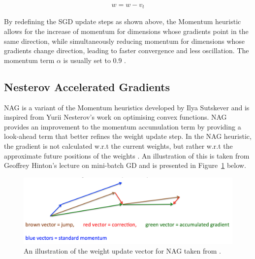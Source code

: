 \begin{equation}
      \label{eq:heuristics:gd:momentum_part_2}
      \begin{split}
            w = w - v_{t}
      \end{split}
\end{equation}

By redefining the \ac{SGD} update steps as shown above, the \ac{Momentum} heuristic allows for the increase of momentum for dimensions whose gradients point in the same direction, while simultaneously reducing momentum for dimensions whose gradients change direction, leading to faster convergence and less oscillation. The momentum term $\alpha$ is usually set to 0.9 \cite{ref:engelbrecht:2007}\cite{ref:ruder:2016}.


\subsection{Nesterov Accelerated Gradients}
\label{sec:heuristics:nag}

\Acl{NAG} is a variant of the \ac{Momentum} heuristics developed by Ilya Sutskever \cite{ref:sutskever:2013-2} and is inspired from Yurii Nesterov's \cite{ref:nesterov:1983} work on optimising convex functions. \ac{NAG} provides an improvement to the momentum accumulation term by providing a look-ahead term that better refines the weight update step. In the \ac{NAG} heuristic, the gradient is not calculated w.r.t the current weights, but rather w.r.t the approximate future positions of the weights \cite{ref:ruder:2016}. An illustration of this is taken from Geoffrey Hinton's lecture on mini-batch \ac{GD} \cite{ref:hinton:2012} and is presented in Figure~\ref{fig:heuristics:gd:nag} below.

\begin{figure}[htbp]
      \includegraphics[width=\textwidth]{images/nag.png}
      \caption{An illustration of the weight update vector for \ac{NAG} taken from \cite{ref:hinton:2012}.}
      \label{fig:heuristics:gd:nag}
\end{figure}


